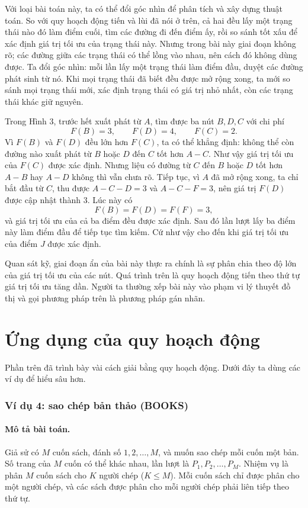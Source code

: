 \documentclass[11pt]{article}
\begin{document}
Với loại bài toán này, ta có thể đổi góc nhìn để phân tích và xây dựng thuật
toán. So với quy hoạch động tiến và lùi đã nói ở trên, cả hai đều lấy một
trạng thái nào đó làm điểm cuối, tìm các đường đi đến điểm ấy, rồi so sánh tốt
xấu để xác định giá trị tối ưu của trạng thái này. Nhưng trong bài này giai
đoạn không rõ; các đường giữa các trạng thái có thể lồng vào nhau, nên cách
đó không dùng được. Ta đổi góc nhìn: mỗi lần lấy một trạng thái làm điểm đầu,
duyệt các đường phát sinh từ nó. Khi mọi trạng thái đã biết đều được mở rộng
xong, ta mới so sánh mọi trạng thái mới, xác định trạng thái có giá trị nhỏ
nhất, còn các trạng thái khác giữ nguyên.

Trong Hình 3, trước hết xuất phát từ $A$, tìm được ba nút $B,D,C$ với chi phí
\[
  F(B)=3,\qquad F(D)=4,\qquad F(C)=2.
\]
Vì $F(B)$ và $F(D)$ đều lớn hơn $F(C)$, ta có thể khẳng định: không thể còn
đường nào xuất phát từ $B$ hoặc $D$ đến $C$ tốt hơn $A-C$. Như vậy giá trị tối
ưu của $F(C)$ được xác định. Nhưng liệu có đường từ $C$ đến $B$ hoặc $D$ tốt
hơn $A-B$ hay $A-D$ không thì vẫn chưa rõ. Tiếp tục, vì $A$ đã mở rộng xong,
ta chỉ bắt đầu từ $C$, thu được $A-C-D=3$ và $A-C-F=3$, nên giá trị $F(D)$
được cập nhật thành $3$. Lúc này có
\[
  F(B)=F(D)=F(F)=3,
\]
và giá trị tối ưu của cả ba điểm đều được xác định. Sau đó lần lượt lấy ba
điểm này làm điểm đầu để tiếp tục tìm kiếm. Cứ như vậy cho đến khi giá trị
tối ưu của điểm $J$ được xác định.

Quan sát kỹ, giai đoạn ẩn của bài này thực ra chính là sự phân chia theo độ
lớn của giá trị tối ưu của các nút. Quá trình trên là quy hoạch động tiến
theo thứ tự giá trị tối ưu tăng dần. Người ta thường xếp bài này vào phạm vi
lý thuyết đồ thị và gọi phương pháp trên là phương pháp gán nhãn.

\section{Ứng dụng của quy hoạch động}

Phần trên đã trình bày vài cách giải bằng quy hoạch động. Dưới đây ta dùng
các ví dụ để hiểu sâu hơn.

\subsubsection*{Ví dụ 4: sao chép bản thảo (BOOKS)}

\paragraph{Mô tả bài toán.}
Giả sử có $M$ cuốn sách, đánh số $1,2,\ldots,M$, và muốn sao chép mỗi cuốn
một bản. Số trang của $M$ cuốn có thể khác nhau, lần lượt là
$P_1,P_2,\ldots,P_M$. Nhiệm vụ là phân $M$ cuốn sách cho $K$ người chép
($K\le M$). Mỗi cuốn sách chỉ được phân cho một người chép, và các sách được
phân cho mỗi người chép phải liên tiếp theo thứ tự.
\end{document}
